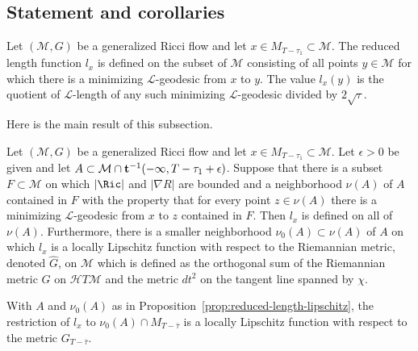 \subsection{Statement and corollaries}


\begin{definition}\label{def:reduced-length-domain}
Let $({\mathcal M},G)$ be a generalized Ricci flow and let $x\in
M_{T-\tau_1}\subset {\mathcal M}$. The reduced length function $l_x$ is defined
on the subset of ${\mathcal M}$ consisting of all points $y\in {\mathcal M}$
for which there is a minimizing ${\mathcal L}$-geodesic from $x$ to $y$. The
value $l_x(y)$ is the quotient of ${\mathcal L}$-length of any such minimizing
${\mathcal L}$-geodesic divided by $2\sqrt{\tau}$.
\end{definition}

Here is the main result of this subsection.

\begin{proposition}\label{prop:reduced-length-lipschitz}
\label{lips}
Let $({\mathcal M},G)$ be a generalized Ricci flow and let $x\in
M_{T-\tau_1}\subset {\mathcal M}$. Let $\epsilon>0$ be given and let $A\subset
{\mathcal M}\cap {\bf t}^{-1}(-\infty,T-\tau_1+\epsilon)$. Suppose that there
is a subset $F\subset {\mathcal M}$ on which $|\Ric|$ and $|\nabla R|$ are
bounded and a neighborhood $\nu(A)$ of $A$ contained in $F$ with the property
that for every point $z\in \nu(A)$ there is a minimizing ${\mathcal
L}$-geodesic from $x$ to $z$ contained in $F$. Then $l_x$ is defined on  all of
$\nu(A)$. Furthermore, there is a smaller neighborhood $\nu_0(A)\subset \nu(A)$
of $A$ on which $l_x$ is a locally Lipschitz function with respect to the
Riemannian metric, denoted $\widehat G$, on ${\mathcal M}$ which is defined as
the orthogonal sum of the Riemannian metric $G$ on ${\mathcal H}T{\mathcal M}$
and the metric $dt^2$ on the tangent line spanned by $\chi$.
\end{proposition}







\begin{corollary}\label{cor:reduced-length-lipschitz-time-slice}
With $A$ and $\nu_0(A)$ as in Proposition~\ref{prop:reduced-length-lipschitz}, the
restriction of $l_x$ to  $\nu_0(A)\cap M_{T-\bar\tau}$ is a locally
Lipschitz function with respect to the metric $G_{T-\bar\tau}$.
\end{corollary}


